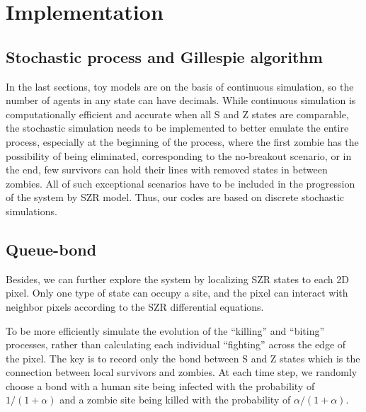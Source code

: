\documentclass[11pt]{article}
\begin{document}
\section{Implementation}
\subsection{Stochastic process and Gillespie algorithm}
In the last sections, toy models are on the basis of continuous simulation, so the number of agents in any state can have decimals. While continuous simulation is computationally efficient and accurate when all S and Z states are comparable, the stochastic simulation needs to be implemented to better emulate the entire process, especially at the beginning of the process, where the first zombie has the possibility of being eliminated, corresponding to the no-breakout scenario, or in the end, few survivors can hold their lines with removed states in between zombies. All of such exceptional scenarios have to be included in the progression of the system by SZR model. Thus, our codes are based on discrete stochastic simulations.

\subsection{Queue-bond}
\label{queue-bond}
Besides, we can further explore the system by localizing SZR states to each 2D pixel. Only one type of state can occupy a site, and the pixel can interact with neighbor pixels according to the SZR differential equations.

To be more efficiently simulate the evolution of the ``killing'' and ``biting'' processes, rather than calculating each individual ``fighting'' across the edge of the pixel. The key is to record only the bond between S and Z states which is the connection between local survivors and zombies. At each time step, we randomly choose a bond with a human site being infected with the probability of $1/(1+\alpha)$ and a zombie site being killed with the probability of $\alpha/(1+\alpha)$.
\end{document}
